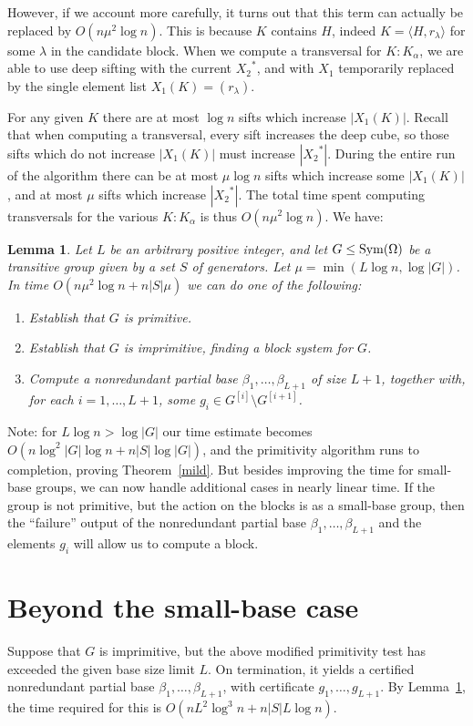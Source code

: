 \documentclass[12pt]{article}
\newcommand{\Sym}{{\rm Sym}}
\newtheorem{lemma}[theorem]{Lemma}
\begin{document}
However, if we account more carefully, it turns out that
this term can actually be replaced by $O(n\mu^2\log n)$.
This is because $K$ contains $H$, indeed $K=\langle H,r_\lambda\rangle$
for some $\lambda$ in the candidate block.
When we compute a transversal for $K:K_\alpha$, we
are able to use deep sifting with the current ${X_2}^*$, and with $X_1$
temporarily replaced by the single element list $X_1(K)=(r_\lambda)$.

For any given $K$ there are at most
$\log n$ sifts which increase $|X_1(K)|$. Recall that when computing
a transversal, every sift increases the deep cube, so those sifts which
do not increase $|X_1(K)|$ must increase $|{X_2}^*|$.
During the entire run of the algorithm there can be at most
$\mu\log n$ sifts which increase some $|X_1(K)|$,
and at most $\mu$ sifts which increase $|{X_2}^*|$.
The total
time spent computing transversals for the various $K:K_\alpha$
is thus $O(n\mu^2\log n)$.
We have:

\begin{lemma}\label{truncated}
  Let $L$ be an arbitrary positive integer,
  and let $G\leq\Sym(\Omega)$ be a
  transitive group given by
  a set $S$ of generators.
  Let $\mu=\min(L\log n,\log|G|)$.
  In time $O(n\mu^2\log n+n|S|\mu)$
  we can do one of the following:
  \begin{enumerate}
  \item Establish that $G$ is primitive.
  \item Establish that $G$ is imprimitive, finding a
    block system for $G$.
  \item Compute a nonredundant partial base  $\beta_1,\ldots,\beta_{L+1}$ of size $L+1$,
    together with, for each $i=1,\ldots,L+1$, some $g_i\in G^{[i]}\setminus G^{[i+1]}$.
  \end{enumerate}

\end{lemma}

Note: for $L\log n>\log|G|$ our time estimate becomes
$O(n\log^2|G|\log n+n|S|\log |G|)$, and the primitivity
algorithm runs to completion, proving Theorem~\ref{mild}.
But besides improving the time for small-base groups, we can
now handle additional cases in nearly linear time.
If the group is not primitive, but the action on the blocks is
as a small-base group, then the ``failure'' output of
the nonredundant
partial base $\beta_1,\ldots,\beta_{L+1}$ and the elements $g_i$
will allow us to compute a block.

\section{Beyond the small-base case}\label{actions}
Suppose that $G$ is imprimitive, but the above modified
primitivity test has exceeded the given base size limit $L$.
On termination, it yields a
certified nonredundant partial base $\beta_1,\ldots,\beta_{L+1}$,
with certificate $g_1,\ldots,g_{L+1}$.
By Lemma~\ref{truncated},
the time required for this is $O(nL^2\log^3 n+n|S|L\log n)$.
\end{document}
